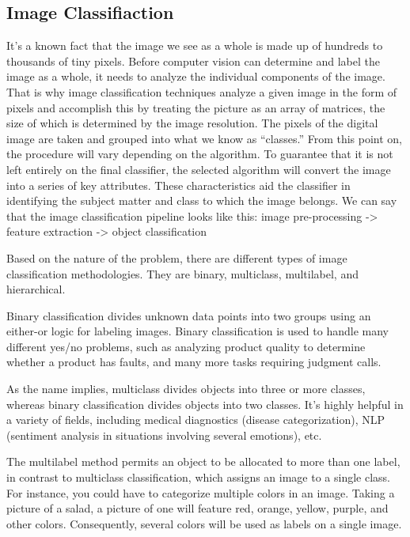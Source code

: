 \subsection*{Image Classifiaction}
	It's a known fact that the image we see as a whole is made up of hundreds to thousands of tiny pixels. Before computer vision can determine and label the image as a whole, it needs to analyze the individual components of the image. That is why image classification techniques analyze a given image in the form of pixels and accomplish this by treating the picture as an array of matrices, the size of which is determined by the image resolution. The pixels of the digital image are taken and grouped into what we know as “classes.” From this point on, the procedure will vary depending on the algorithm. To guarantee that it is not left entirely on the final classifier, the selected algorithm will convert the image into a series of key attributes. These characteristics aid the classifier in identifying the subject matter and class to which the image belongs. 
	We can say that the image classification pipeline looks like this:
	image pre-processing -> feature extraction -> object classification
	
	
	Based on the nature of the problem, there are different types of image classification methodologies. They are binary, multiclass, multilabel, and hierarchical.
	
	Binary classification divides unknown data points into two groups using an either-or logic for labeling images. Binary classification is used to handle many different yes/no problems, such as analyzing product quality to determine whether a product has faults, and many more tasks requiring judgment calls.
	
	As the name implies, multiclass divides objects into three or more classes, whereas binary classification divides objects into two classes. It's highly helpful in a variety of fields, including medical diagnostics (disease categorization), NLP (sentiment analysis in situations involving several emotions), etc.
	 
	The multilabel method permits an object to be allocated to more than one label, in contrast to multiclass classification, which assigns an image to a single class. For instance, you could have to categorize multiple colors in an image. Taking a picture of a  salad, a picture of one will feature red, orange, yellow, purple, and other colors. Consequently, several colors will be used as labels on a single image.
	
